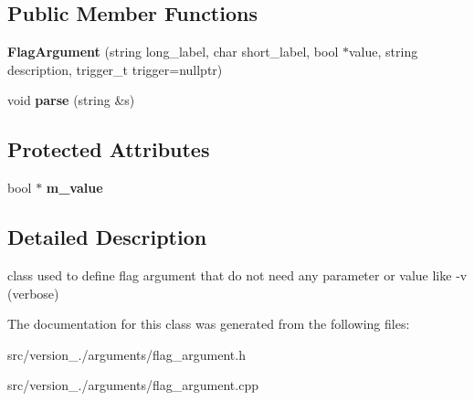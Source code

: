 \subsection*{Public Member Functions}
\begin{DoxyCompactItemize}
\item 
\mbox{\label{classez_1_1arguments_1_1FlagArgument_a30fffa2ded35d77bc527087a5ea13f81}} 
{\bfseries Flag\+Argument} (string long\+\_\+label, char short\+\_\+label, bool $\ast$value, string description, trigger\+\_\+t trigger=nullptr)
\item 
\mbox{\label{classez_1_1arguments_1_1FlagArgument_a9d0fdf7d0981c5b49308d17f44b142c6}} 
void {\bfseries parse} (string \&s)
\end{DoxyCompactItemize}
\subsection*{Protected Attributes}
\begin{DoxyCompactItemize}
\item 
\mbox{\label{classez_1_1arguments_1_1FlagArgument_ac93e0090f5854f573d90270b6d252eea}} 
bool $\ast$ {\bfseries m\+\_\+value}
\end{DoxyCompactItemize}


\subsection{Detailed Description}
class used to define flag argument that do not need any parameter or value like -\/v (verbose) 

The documentation for this class was generated from the following files\+:\begin{DoxyCompactItemize}
\item 
src/version\+\_./arguments/flag\+\_\+argument.\+h\item 
src/version\+\_./arguments/flag\+\_\+argument.\+cpp\end{DoxyCompactItemize}
